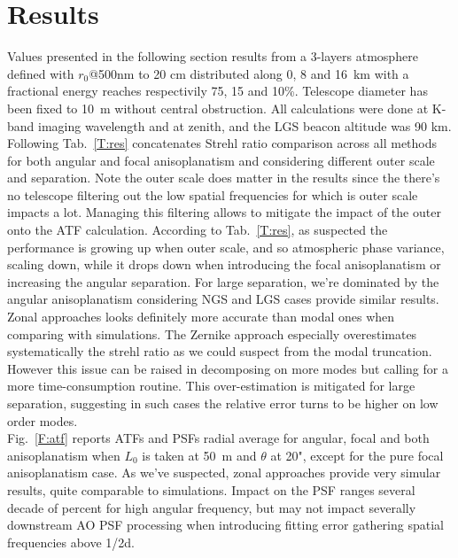 \documentclass[12pt]{article}
\newcommand{\rz}{r_0}
\begin{document}
\section{Results}

Values presented in the following section results from a 3-layers atmosphere defined with $\rz$@500nm to 20 cm distributed along 0, 8 and 16~km with a fractional energy reaches respectivily 75, 15 and 10\%. Telescope diameter has been fixed to 10~m without central obstruction. All calculations were done at K-band imaging wavelength and at zenith, and the LGS beacon altitude was 90 km.\\

Following Tab.~\ref{T:res} concatenates Strehl ratio comparison across all methods for both angular and focal anisoplanatism and considering different outer scale and separation. Note the outer scale does matter in the results since the there's no telescope filtering out the low spatial frequencies for which is outer scale impacts a lot. Managing this filtering allows to mitigate the impact of the outer onto the ATF calculation. According to Tab.~\ref{T:res}, as suspected the performance is growing up when outer scale, and so atmospheric phase variance, scaling down, while it drops down when introducing the focal anisoplanatism or increasing the angular separation. For large separation, we're dominated by the angular anisoplanatism considering NGS and LGS cases provide similar results.\\

Zonal approaches looks definitely more accurate than modal ones when comparing with simulations. The Zernike approach especially overestimates systematically the strehl ratio as we could suspect from the modal truncation. However this issue can be raised in decomposing on more modes but calling for a more time-consumption routine. This over-estimation is mitigated for large separation, suggesting in such cases the relative error turns to be higher on low order modes.\\

Fig.~\ref{F:atf} reports ATFs and PSFs radial average for angular, focal and both anisoplanatism when $L_0$ is taken at 50~m and $\theta$ at 20", except for the pure focal anisoplanatism case. As we've suspected, zonal approaches provide very simular results, quite comparable to simulations. Impact on the PSF ranges several decade of percent for high angular frequency, but may not impact severally downstream AO PSF processing when introducing fitting error gathering spatial frequencies above 1/2d.
\end{document}
